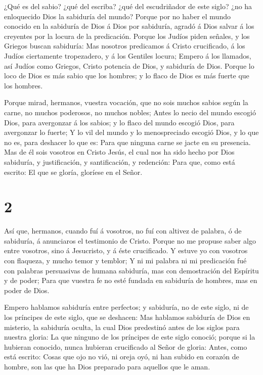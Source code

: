  ¿Qué es del sabio? ¿qué del escriba? ¿qué del escudriñador
de este siglo? ¿no ha enloquecido Dios la sabiduría del mundo?
 Porque por no haber el mundo conocido en la sabiduría de
Dios á Dios por sabiduría, agradó á Dios salvar á los creyentes por la
locura de la predicación.  Porque los Judíos piden señales,
y los Griegos buscan sabiduría:  Mas nosotros predicamos á
Cristo crucificado, á los Judíos ciertamente tropezadero, y á los
Gentiles locura;  Empero á los llamados, así Judíos como
Griegos, Cristo potencia de Dios, y sabiduría de Dios. 
Porque lo loco de Dios es más sabio que los hombres; y lo flaco de Dios
es más fuerte que los hombres.

 Porque mirad, hermanos, vuestra vocación, que no sois
muchos sabios según la carne, no muchos poderosos, no muchos nobles;
 Antes lo necio del mundo escogió Dios, para avergonzar á
los sabios; y lo flaco del mundo escogió Dios, para avergonzar lo
fuerte;  Y lo vil del mundo y lo menospreciado escogió
Dios, y lo que no es, para deshacer lo que es:  Para que
ninguna carne se jacte en su presencia.  Mas de él sois
vosotros en Cristo Jesús, el cual nos ha sido hecho por Dios sabiduría,
y justificación, y santificación, y redención:  Para que,
como está escrito: El que se gloría, gloríese en el Señor.

\hypertarget{section-1}{%
\section{2}\label{section-1}}

 Así que, hermanos, cuando fuí á vosotros, no fuí con
altivez de palabra, ó de sabiduría, á anunciaros el testimonio de
Cristo.  Porque no me propuse saber algo entre vosotros,
sino á Jesucristo, y á éste crucificado.  Y estuve yo con
vosotros con flaqueza, y mucho temor y temblor;  Y ni mi
palabra ni mi predicación fué con palabras persuasivas de humana
sabiduría, mas con demostración del Espíritu y de poder; 
Para que vuestra fe no esté fundada en sabiduría de hombres, mas en
poder de Dios.

 Empero hablamos sabiduría entre perfectos; y sabiduría, no
de este siglo, ni de los príncipes de este siglo, que se deshacen:
 Mas hablamos sabiduría de Dios en misterio, la sabiduría
oculta, la cual Dios predestinó antes de los siglos para nuestra gloria:
 La que ninguno de los príncipes de este siglo conoció;
porque si la hubieran conocido, nunca hubieran crucificado al Señor de
gloria:  Antes, como está escrito: Cosas que ojo no vió, ni
oreja oyó, ni han subido en corazón de hombre, son las que ha Dios
preparado para aquellos que le aman.

